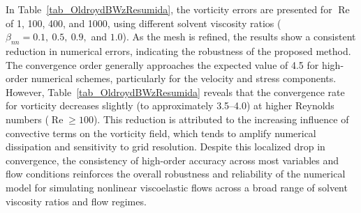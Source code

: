 \documentclass[preprint, 12pt]{elsarticle}
\begin{document}
In Table~\ref{tab_OldroydBWzResumida}, the vorticity errors are presented for
$\operatorname{Re}$ of 1, 100, 400, and 1000, using different solvent viscosity
ratios ($\beta_{nn} = 0.1,\ 0.5,\ 0.9,$ and $1.0$). As the mesh is refined,{\color{red} the
results show a consistent reduction in numerical errors, indicating the
robustness of the proposed method. The convergence order generally approaches
the expected value of 4.5 for high-order numerical schemes, particularly for
the velocity and stress components. However, Table~\ref{tab_OldroydBWzResumida}
reveals that the convergence rate for vorticity decreases slightly (to
approximately 3.5–4.0) at higher Reynolds numbers ($\operatorname{Re} \geq
100$). This reduction is attributed to the increasing influence of convective
terms on the vorticity field, which tends to amplify numerical dissipation and
sensitivity to grid resolution. Despite this localized drop in convergence, the
consistency of high-order accuracy across most variables and flow conditions
reinforces the overall robustness and reliability of the numerical model for
simulating nonlinear viscoelastic flows across a broad range of solvent
viscosity ratios and flow regimes.}
\end{document}

